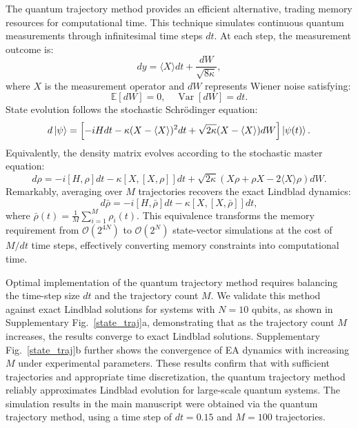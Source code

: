 \documentclass[reprint,superscriptaddress,preprintnumbers,longbibliography,
amsmath,amssymb,aps,floatfix,pra,twocolumn, tightenlines %
]{revtex4-2}
\begin{document}
    The quantum trajectory method provides an efficient alternative, trading memory resources for computational time. This technique simulates continuous quantum measurements through infinitesimal time steps $dt$. At each step, the measurement outcome is:
    \begin{equation}
    dy = \langle X \rangle dt + \frac{dW}{\sqrt{8\kappa}},
    \end{equation}
    where $X$ is the measurement operator and $dW$ represents Wiener noise satisfying:
    \begin{equation}
    \mathbb{E}[dW] = 0, \quad \operatorname{Var}[dW] = dt.
    \end{equation}
    State evolution follows the stochastic Schrödinger equation:
    \begin{equation}
    d\ket{\psi} = \left[ -iH dt -\kappa(X-\langle X\rangle)^2 dt + \sqrt{2\kappa}(X-\langle X \rangle)dW \right] \ket{\psi(t)}.
    \end{equation}
    Equivalently, the density matrix evolves according to the stochastic master equation:
    \begin{equation}
    d\rho = -i [H,\rho]dt -\kappa[X,[X,\rho]]dt + \sqrt{2\kappa}\left( X\rho + \rho X - 2\langle X \rangle\rho \right)dW.
    \end{equation}
    Remarkably, averaging over $M$ trajectories recovers the exact Lindblad dynamics:
    \begin{equation}
    d\bar{\rho} = -i [H,\bar{\rho}]dt -\kappa[X,[X,\bar{\rho}]]dt,
    \end{equation}
    where $\bar{\rho}(t) = \frac{1}{M}\sum_{i=1}^M \rho_i(t)$. This equivalence transforms the memory requirement from $\mathcal{O}(2^{4N})$ to $\mathcal{O}(2^{N})$ state-vector simulations at the cost of $M/dt$ time steps, effectively converting memory constraints into computational time.
    
    Optimal implementation of the quantum trajectory method requires balancing the time-step size \( dt \) and the trajectory count \( M \). We validate this method against exact Lindblad solutions for systems with \( N = 10 \) qubits, as shown in Supplementary Fig.~\ref{state_traj}a, demonstrating that as the trajectory count \( M \) increases, the results converge to exact Lindblad solutions. Supplementary Fig.~\ref{state_traj}b further shows the convergence of EA dynamics with increasing \( M \) under experimental parameters. These results confirm that with sufficient trajectories and appropriate time discretization, the quantum trajectory method reliably approximates Lindblad evolution for large-scale quantum systems. The simulation results in the main manuscript were obtained via the quantum trajectory method, using a time step of \( dt = 0.15 \) and \( M = 100 \) trajectories.
    
\end{document}
